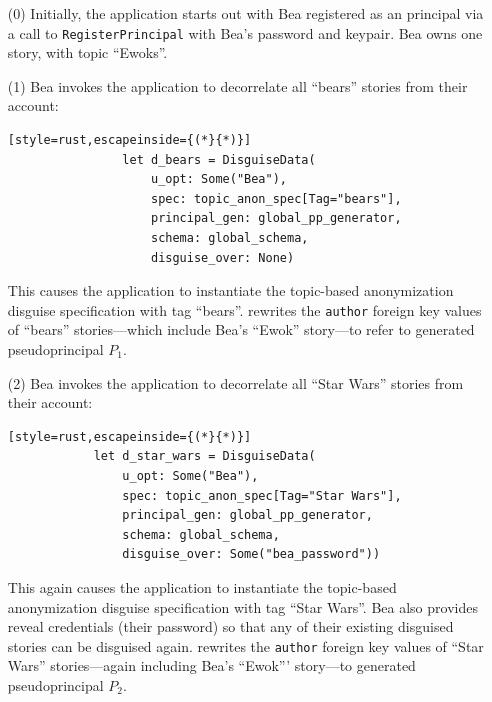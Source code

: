 \begin{enumerate}[nosep]
    \item[(0)] Initially, the application starts out with Bea registered as an
        \sys principal via a call to \texttt{RegisterPrincipal} with Bea's
        password and keypair. Bea owns one story, with topic ``Ewoks''.

    \item[(1)] Bea invokes the application to decorrelate all ``bears'' stories 
        from their account: 

            \vspace{12pt}
            \begin{lstlisting}[style=rust,escapeinside={(*}{*)}]
                let d_bears = DisguiseData(
                    u_opt: Some("Bea"), 
                    spec: topic_anon_spec[Tag="bears"],
                    principal_gen: global_pp_generator,
                    schema: global_schema,
                    disguise_over: None)
            \end{lstlisting}

        This causes the application to instantiate the
        topic-based anonymization disguise specification with tag ``bears''.
        \sys rewrites the \texttt{author} foreign key values of ``bears''
         stories---which include Bea's ``Ewok'' story---to refer to generated
        pseudoprincipal $P_1$.

        \item[(2)] Bea invokes the application to decorrelate all ``Star Wars''
            stories from
        their account: 

        \vspace{12pt}
        \begin{lstlisting}[style=rust,escapeinside={(*}{*)}]
            let d_star_wars = DisguiseData(
                u_opt: Some("Bea"), 
                spec: topic_anon_spec[Tag="Star Wars"],
                principal_gen: global_pp_generator,
                schema: global_schema,
                disguise_over: Some("bea_password"))
        \end{lstlisting}

        This again causes the application to instantiate the topic-based
        anonymization disguise specification with tag ``Star Wars''. Bea also
        provides reveal credentials (\eg their password) so that any of their existing
        disguised stories can be disguised again. \sys rewrites the
        \texttt{author} foreign key values of ``Star Wars'' stories---again
        including Bea's ``Ewok''' story---to generated pseudoprincipal $P_2$.
    

\end{enumerate}
